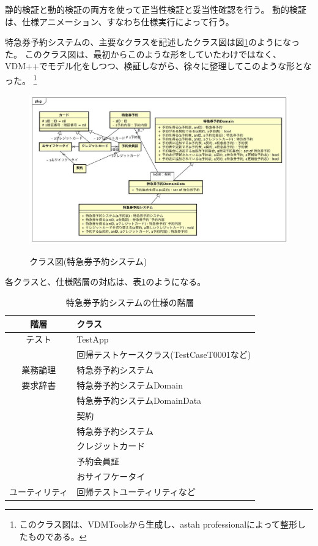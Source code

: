 静的検証と動的検証の両方を使って正当性検証と妥当性確認を行う。
動的検証は、仕様アニメーション、すなわち仕様実行によって行う。

特急券予約システムの、主要なクラスを記述したクラス図は図\ref{fig:ExpressReservationClassDiagram}のようになった。
このクラス図は、最初からこのような形をしていたわけではなく、
VDM++でモデル化をしつつ、検証しながら、徐々に整理してこのような形となった。
\footnote{
このクラス図は、VDMToolsから生成し、astah professionalによって整形したものである。
}

\begin{figure}[h]
	\centering
	{\includegraphics[width=55zw, keepaspectratio]{./ExpressReservation/image/ClassDiagram.jpg}}
	\caption{クラス図(特急券予約システム)}
	\label{fig:ExpressReservationClassDiagram}
\end{figure}

各クラスと、仕様階層の対応は、表\ref{SpecLevel2}のようになる。

\begin{table}[h]
	\caption[特急券予約システムの仕様の階層]{特急券予約システムの仕様の階層}
	\label{SpecLevel2}
	\begin{center}
		\setlength{\tabcolsep}{3pt}
		\begin{tabular}{|c|l|} \hline
			階層 & クラス   \\ \hline\hline
			テスト & TestApp \\ \cline {2-2}
			  & 回帰テストケースクラス(TestCaseT0001など) \\ \hline
			業務論理 & 特急券予約システム \\ \hline
			要求辞書 & 特急券予約システムDomain   \\ \cline {2-2}
			  & 特急券予約システムDomainData \\ \cline {2-2}
			  & 契約   \\ \cline {2-2}
			  & 特急券予約システム  \\ \cline {2-2}
			  & クレジットカード  \\ \cline {2-2}
			  & 予約会員証  \\ \cline {2-2}
			  & おサイフケータイ \\ \hline
			ユーティリティ & 回帰テストユーティリティなど \\ \hline
		\end{tabular}
	\end{center}
\end{table}

